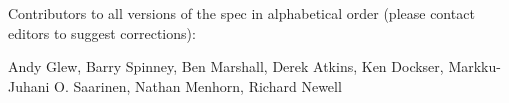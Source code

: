 
%
%

\noindent
Contributors to all versions of the spec in
alphabetical order (please contact editors to suggest
corrections):

Andy Glew,
Barry Spinney,
Ben Marshall,
Derek Atkins,
Ken Dockser,
Markku-Juhani O. Saarinen,
Nathan Menhorn,
Richard Newell

